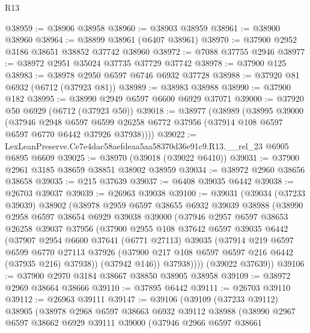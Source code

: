\begin{lexlean}{R13}
\begin{coremodule}
@38959 := @38906 @38958
@38960 := @38903 @38959
@38961 := @38900 @38960
@38964 := @38899 @38961 (@6407 @38961)
@38970 := @37900 @2952 @3186 @38651 @38852 @37742 @38960
@38972 := @7088 @37755 @2946
@38977 := @38972 @2951 @35024 @37735 @37729 @37742
@38978 := @37900 @125
@38983 := @38978 @2950 @6597 @6746 @6932 @37728
@38988 := @37920 @81 @6932 (@6712 (@37923 @81))
@38989 := @38983 @38988
@38990 := @37900 @182
@38995 := @38990 @2949 @6597 @6600 @6929 @37071
@39000 := @37920 @50 @6929 (@6712 (@37923 @50))
@39018 := @38977
    (@38989
      (@38995
        @39000
        (@37946
          @2948
          @6597
          @6599
          @26258
          @6772
          @37956
          (@37914 @108 @6597 @6597 @6770 @6442 @37926 @37938))))
@39022 := LexLeanPreserve.Ce7e4dac58aefdeaa5aa58370d36e91c9.R13.__rel_23 @6905 @6895 @6609
@39025 := @38970 (@39018 (@39022 @6410))
@39031 := @37900 @2961 @3185 @38659 @38851 @38902 @38959
@39034 := @38972 @2960 @38656 @38658
@39035 := @215 @37639
@39037 := @6408 @39035 @6442
@39038 := @26703 @39037
@39039 := @26963 @39038
@39100 := @39031
    (@39034
      (@37233 @39039)
      @38902
      (@38978
        @2959
        @6597
        @38655
        @6932
        @39039
        @38988
        (@38990
          @2958
          @6597
          @38654
          @6929
          @39038
          @39000
          (@37946
            @2957
            @6597
            @38653
            @26258
            @39037
            @37956
            (@37900
              @2955
              @108
              @37642
              @6597
              @39035
              @6442
              (@37907
                @2954
                @6600
                @37641
                (@6771 @27113)
                @39035
                (@37914
                  @219
                  @6597
                  @6599
                  @6770
                  @27113
                  @37926
                  (@37900 @217 @108 @6597 @6597 @216 @6442 (@37935 @216) @37938))
                (@37942 @146))
              @37938))))
      (@39022 @37639))
@39106 := @37900 @2970 @3184 @38667 @38850 @38905 @38958
@39109 := @38972 @2969 @38664 @38666
@39110 := @37895 @6442
@39111 := @26703 @39110
@39112 := @26963 @39111
@39147 := @39106
    (@39109
      (@37233 @39112)
      @38905
      (@38978
        @2968
        @6597
        @38663
        @6932
        @39112
        @38988
        (@38990
          @2967
          @6597
          @38662
          @6929
          @39111
          @39000
          (@37946
            @2966
            @6597
            @38661

\end{coremodule}
\end{lexlean}

